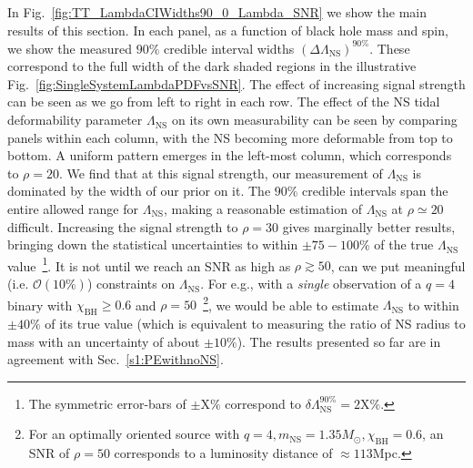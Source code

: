 \documentclass[aps,prd,amsmath,floats,floatfix, twocolumn,
superscriptaddress,nofootinbib,showpacs]{revtex4-1}
\newcommand{\lambdans}{\Lambda_\mathrm{NS}}
\newcommand{\dlambda}{\delta\lambdans^{90\%}}
\newcommand{\chibh}{\chi_\mathrm{BH}}
\newcommand{\mns}{m_\mathrm{NS}}
\begin{document}
In Fig.~\ref{fig:TT_LambdaCIWidths90_0_Lambda_SNR} we show the main results of
this section. In each panel, as a function of black hole mass and spin, we show
the measured $90\%$ credible interval widths $(\Delta\lambdans)^{90\%}$. These
correspond to the full width of the dark shaded regions in the illustrative
Fig.~\ref{fig:SingleSystemLambdaPDFvsSNR}. The effect of increasing signal
strength can be seen as we go from left to right in each row. The effect of the
NS tidal deformability parameter $\lambdans$ on its own measurability can be
seen by comparing panels within each column, with the NS becoming more
deformable from top to bottom. 
%
A uniform pattern emerges in the left-most column, which corresponds to $\rho=20$.
We find that at this signal strength, our measurement of $\lambdans$ is
dominated by the width of our prior on it. The $90\%$ credible intervals span
the entire allowed range for $\lambdans$, making a reasonable estimation of
$\lambdans$ at $\rho\simeq20$ difficult.
% 
Increasing the signal strength to $\rho=30$ gives marginally better results,
bringing down the statistical uncertainties to within $\pm 75-100\%$ of the
true $\lambdans$ value~\footnote{The symmetric error-bars of $\pm\mathrm{X}\%$
correspond to $\dlambda = 2\mathrm{X}\%$.}.
%
It is not until we reach an SNR as high as $\rho\gtrsim 50$, can we put
meaningful (i.e. $\mathcal{O}(10\%)$) constraints on $\lambdans$. For e.g.,
with a {\it single} observation of a $q=4$ binary with $\chibh\geq 0.6$ and
$\rho = 50$~\footnote{For an optimally oriented source with
$q=4, \mns=1.35M_\odot, \chibh=0.6$, an SNR of $\rho = 50$ corresponds to
a luminosity distance of $\approx 113$Mpc.}, we would be able to estimate 
$\lambdans$ to within $\pm 40\%$ of its true value (which is equivalent to
measuring the ratio of NS radius to mass with an uncertainty of about
$\pm 10\%$).
% 
The results presented so far are in agreement with Sec.~\ref{s1:PEwithnoNS}.
\end{document}

